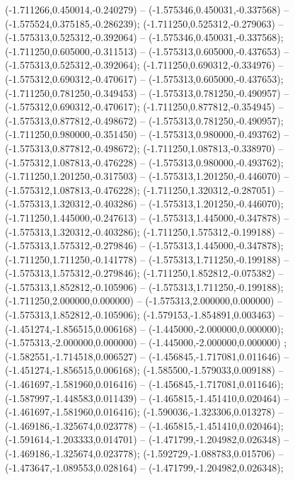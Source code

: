  (-1.711266,0.450014,-0.240279) -- (-1.575346,0.450031,-0.337568) -- (-1.575524,0.375185,-0.286239);
 (-1.711250,0.525312,-0.279063) -- (-1.575313,0.525312,-0.392064) -- (-1.575346,0.450031,-0.337568);
 (-1.711250,0.605000,-0.311513) -- (-1.575313,0.605000,-0.437653) -- (-1.575313,0.525312,-0.392064);
 (-1.711250,0.690312,-0.334976) -- (-1.575312,0.690312,-0.470617) -- (-1.575313,0.605000,-0.437653);
 (-1.711250,0.781250,-0.349453) -- (-1.575313,0.781250,-0.490957) -- (-1.575312,0.690312,-0.470617);
 (-1.711250,0.877812,-0.354945) -- (-1.575313,0.877812,-0.498672) -- (-1.575313,0.781250,-0.490957);
 (-1.711250,0.980000,-0.351450) -- (-1.575313,0.980000,-0.493762) -- (-1.575313,0.877812,-0.498672);
 (-1.711250,1.087813,-0.338970) -- (-1.575312,1.087813,-0.476228) -- (-1.575313,0.980000,-0.493762);
 (-1.711250,1.201250,-0.317503) -- (-1.575313,1.201250,-0.446070) -- (-1.575312,1.087813,-0.476228);
 (-1.711250,1.320312,-0.287051) -- (-1.575313,1.320312,-0.403286) -- (-1.575313,1.201250,-0.446070);
 (-1.711250,1.445000,-0.247613) -- (-1.575313,1.445000,-0.347878) -- (-1.575313,1.320312,-0.403286);
 (-1.711250,1.575312,-0.199188) -- (-1.575313,1.575312,-0.279846) -- (-1.575313,1.445000,-0.347878);
 (-1.711250,1.711250,-0.141778) -- (-1.575313,1.711250,-0.199188) -- (-1.575313,1.575312,-0.279846);
 (-1.711250,1.852812,-0.075382) -- (-1.575313,1.852812,-0.105906) -- (-1.575313,1.711250,-0.199188);
 (-1.711250,2.000000,0.000000) -- (-1.575313,2.000000,0.000000) -- (-1.575313,1.852812,-0.105906);
 (-1.579153,-1.854891,0.003463) -- (-1.451274,-1.856515,0.006168) -- (-1.445000,-2.000000,0.000000);
 (-1.575313,-2.000000,0.000000) -- (-1.445000,-2.000000,0.000000) ;
 (-1.582551,-1.714518,0.006527) -- (-1.456845,-1.717081,0.011646) -- (-1.451274,-1.856515,0.006168);
 (-1.585500,-1.579033,0.009188) -- (-1.461697,-1.581960,0.016416) -- (-1.456845,-1.717081,0.011646);
 (-1.587997,-1.448583,0.011439) -- (-1.465815,-1.451410,0.020464) -- (-1.461697,-1.581960,0.016416);
 (-1.590036,-1.323306,0.013278) -- (-1.469186,-1.325674,0.023778) -- (-1.465815,-1.451410,0.020464);
 (-1.591614,-1.203333,0.014701) -- (-1.471799,-1.204982,0.026348) -- (-1.469186,-1.325674,0.023778);
 (-1.592729,-1.088783,0.015706) -- (-1.473647,-1.089553,0.028164) -- (-1.471799,-1.204982,0.026348);
